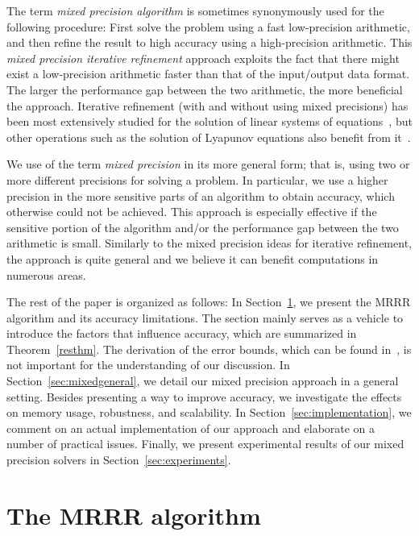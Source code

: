 \documentclass[final]{siamltex}
\begin{document}
The term {\it mixed precision algorithm} is sometimes synonymously
used for the following procedure: First solve the problem using a fast
low-precision arithmetic, and then refine the result to high accuracy using
a high-precision arithmetic.
This {\it mixed precision iterative refinement} approach
exploits the fact 
that  
there might exist a low-precision arithmetic faster
than that of the input/output data format. The larger the performance gap
between the two arithmetic, the more beneficial the
approach. Iterative refinement (with and without using mixed precisions) has
been most extensively studied for the 
solution of linear systems of equations~\cite{HIGHAM01101997},
but other 
operations such as the solution of Lyapunov equations   
also benefit from it~\cite{Benner:2011:MAS:2010586.2010622}.
 
We use of the term {\it mixed precision} in its more general form; that is,
using two or more different precisions for solving a problem. In particular,
we use a
higher precision in the more sensitive parts of an 
algorithm to obtain accuracy, which otherwise could not be achieved. This
approach is especially effective if the sensitive 
portion of the algorithm and/or the performance gap
between the two arithmetic is small. Similarly to the mixed
precision ideas for iterative refinement, the approach is quite
general and we believe it can benefit computations in numerous areas. 

The rest of the paper is organized as follows: In
Section~\ref{sec:mrrralgorithm}, we present the MRRR algorithm and its
accuracy limitations. The section mainly serves as a vehicle to introduce the
factors that influence accuracy, which are summarized in
Theorem~\ref{resthm}. The derivation of
the error bounds, which can be found in~\cite{Willems:framework}, is not important
for the understanding of our discussion. In
Section~\ref{sec:mixedgeneral}, we detail our mixed 
precision approach in a general setting. Besides presenting a way to improve
accuracy, we investigate the effects on memory
usage, robustness, and scalability.
In Section~\ref{sec:implementation}, we comment on an actual implementation
of our approach and 
elaborate on a number of practical issues. Finally, we present experimental
results of our mixed precision solvers in Section~\ref{sec:experiments}. 


\section{The MRRR algorithm}
\label{sec:mrrralgorithm}
\end{document}

